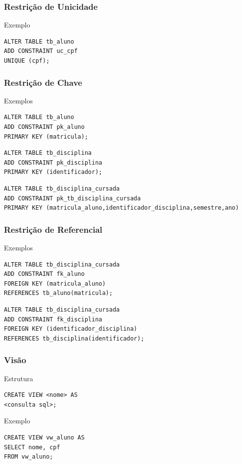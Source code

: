 \documentclass{beamer}
\begin{document}
\begin{frame}[fragile]
\frametitle{Restrição de Unicidade}

\begin{exampleblock}{Exemplo}
	\begin{lstlisting}
ALTER TABLE tb_aluno
ADD CONSTRAINT uc_cpf
UNIQUE (cpf);
	\end{lstlisting}
\end{exampleblock}
\end{frame}

\begin{frame}[fragile]
\frametitle{Restrição de Chave}

\begin{exampleblock}{Exemplos}
	\begin{lstlisting}
ALTER TABLE tb_aluno
ADD CONSTRAINT pk_aluno 
PRIMARY KEY (matricula);
	\end{lstlisting}

	\begin{lstlisting}
ALTER TABLE tb_disciplina
ADD CONSTRAINT pk_disciplina 
PRIMARY KEY (identificador);
	\end{lstlisting}
	
	\begin{lstlisting}
ALTER TABLE tb_disciplina_cursada
ADD CONSTRAINT pk_tb_disciplina_cursada
PRIMARY KEY (matricula_aluno,identificador_disciplina,semestre,ano)	
	\end{lstlisting}
\end{exampleblock}
\end{frame}

\begin{frame}[fragile]
\frametitle{Restrição de Referencial}

\begin{exampleblock}{Exemplos}
	\begin{lstlisting}
ALTER TABLE tb_disciplina_cursada
ADD CONSTRAINT fk_aluno
FOREIGN KEY (matricula_aluno)
REFERENCES tb_aluno(matricula);
	\end{lstlisting}
	
	\begin{lstlisting}
ALTER TABLE tb_disciplina_cursada
ADD CONSTRAINT fk_disciplina
FOREIGN KEY (identificador_disciplina)
REFERENCES tb_disciplina(identificador);
	\end{lstlisting}	
\end{exampleblock}
\end{frame}

\begin{frame}[fragile]
\frametitle{Visão}

\begin{block}{Estrutura}
	\begin{lstlisting}
CREATE VIEW <nome> AS
<consulta sql>;
	\end{lstlisting}
\end{block}\vfill

\begin{exampleblock}{Exemplo}
	\begin{lstlisting}
CREATE VIEW vw_aluno AS
SELECT nome, cpf
FROM vw_aluno;
	\end{lstlisting}
\end{exampleblock}
\end{frame}
\end{document}
